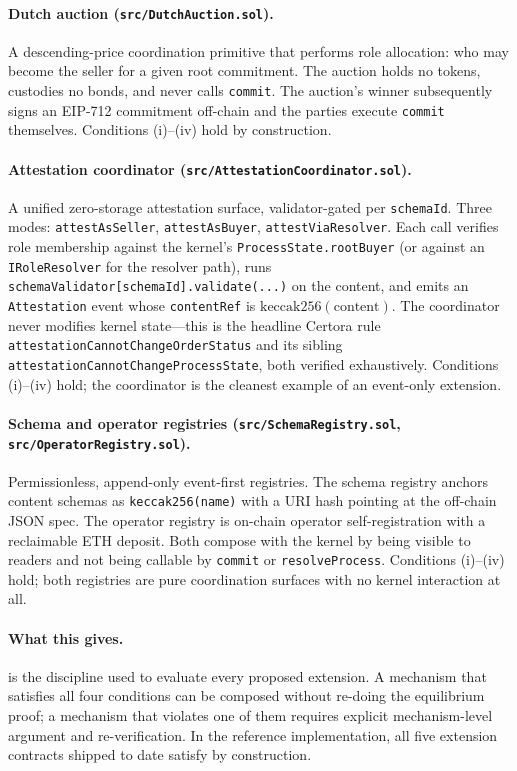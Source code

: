 \documentclass[11pt,a4paper]{article}
\theoremstyle{definition}
\theoremstyle{remark}
\begin{document}
\paragraph{Dutch auction (\texttt{src/DutchAuction.sol}).}
A descending-price coordination primitive that performs role
allocation: who may become the seller for a given root commitment.
The auction holds no tokens, custodies no bonds, and never calls
\texttt{commit}. The auction's winner subsequently signs an
EIP-712 commitment off-chain and the parties execute \texttt{commit}
themselves. Conditions (i)--(iv) hold by construction.

\paragraph{Attestation coordinator (\texttt{src/AttestationCoordinator.sol}).}
A unified zero-storage attestation surface, validator-gated per
\texttt{schemaId}. Three modes: \texttt{attestAsSeller},
\texttt{attestAsBuyer}, \texttt{attestViaResolver}. Each call
verifies role membership against the kernel's
\texttt{ProcessState.rootBuyer} (or against an
\texttt{IRoleResolver} for the resolver path), runs
\texttt{schemaValidator[schemaId].validate(...)} on the content, and
emits an \texttt{Attestation} event whose \texttt{contentRef} is
$\mathrm{keccak256}(\text{content})$. The coordinator never modifies
kernel state---this is the headline Certora rule
\texttt{attestationCannotChangeOrderStatus} and its sibling
\texttt{attestationCannotChangeProcessState}, both verified
exhaustively. Conditions (i)--(iv) hold; the coordinator is the
cleanest example of an event-only extension.

\paragraph{Schema and operator registries (\texttt{src/SchemaRegistry.sol}, \texttt{src/OperatorRegistry.sol}).}
Permissionless, append-only event-first registries. The schema
registry anchors content schemas as \texttt{keccak256(name)} with a
URI hash pointing at the off-chain JSON spec. The operator registry
is on-chain operator self-registration with a reclaimable ETH
deposit. Both compose with the kernel by being visible to readers
and not being callable by \texttt{commit} or
\texttt{resolveProcess}. Conditions (i)--(iv) hold; both registries
are pure coordination surfaces with no kernel interaction at all.

\paragraph{What this gives.}
 is the discipline used to evaluate every
proposed extension. A mechanism that satisfies all four conditions
can be composed without re-doing the equilibrium proof; a mechanism
that violates one of them requires explicit mechanism-level argument
and re-verification. In the reference implementation, all five
extension contracts shipped to date satisfy
 by construction.
\end{document}
